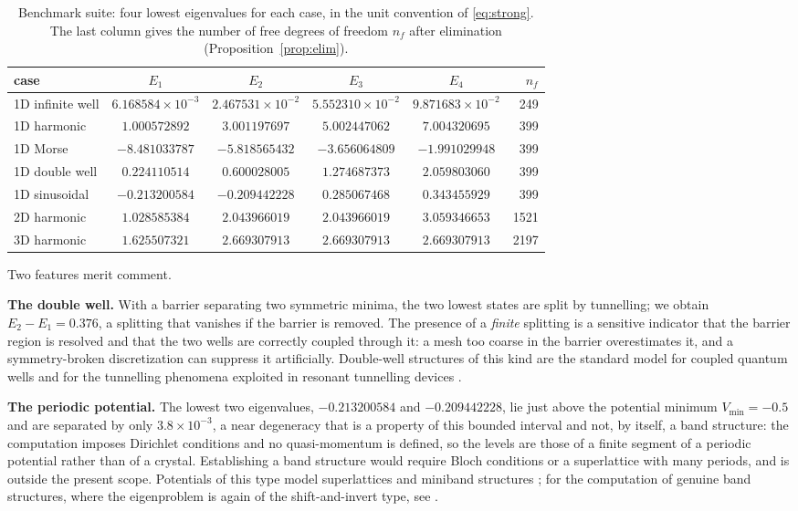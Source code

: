 \documentclass[pdflatex,sn-mathphys-num]{sn-jnl}
\theoremstyle{thmstyleone}%
\theoremstyle{thmstyletwo}%
\theoremstyle{thmstylethree}%
\begin{document}
\begin{table}[t]
\caption{Benchmark suite: four lowest eigenvalues for each case, in the unit
convention of \eqref{eq:strong}. The last column gives the number of free
degrees of freedom $n_f$ after elimination
(Proposition~\ref{prop:elim}).}\label{tab:cases}
\begin{tabular}{@{}lccccr@{}}
\toprule
case & $E_1$ & $E_2$ & $E_3$ & $E_4$ & $n_f$ \\
\midrule
1D infinite well    & $6.168584\times10^{-3}$ & $2.467531\times10^{-2}$ & $5.552310\times10^{-2}$ & $9.871683\times10^{-2}$ & 249 \\
1D harmonic         & $1.000572892$ & $3.001197697$ & $5.002447062$ & $7.004320695$ & 399 \\
1D Morse            & $-8.481033787$ & $-5.818565432$ & $-3.656064809$ & $-1.991029948$ & 399 \\
1D double well      & $0.224110514$ & $0.600028005$ & $1.274687373$ & $2.059803060$ & 399 \\
1D sinusoidal       & $-0.213200584$ & $-0.209442228$ & $0.285067468$ & $0.343455929$ & 399 \\
2D harmonic         & $1.028585384$ & $2.043966019$ & $2.043966019$ & $3.059346653$ & 1521 \\
3D harmonic         & $1.625507321$ & $2.669307913$ & $2.669307913$ & $2.669307913$ & 2197 \\
\bottomrule
\end{tabular}
\end{table}

Two features merit comment.

\textbf{The double well.} With a barrier separating two symmetric minima, the
two lowest states are split by tunnelling; we obtain $E_2 - E_1 = 0.376$, a
splitting that vanishes if the barrier is removed. The presence of a
\emph{finite} splitting is a sensitive indicator that the barrier region is
resolved and that the two wells are correctly coupled through it: a mesh too
coarse in the barrier overestimates it, and a symmetry-broken discretization can
suppress it artificially. Double-well structures of this kind are the standard
model for coupled quantum wells and for the tunnelling phenomena exploited in
resonant tunnelling devices \cite{wang2009}.

\textbf{The periodic potential.} The lowest two eigenvalues,
$-0.213200584$ and $-0.209442228$, lie just above the potential minimum
$V_{\min} = -0.5$ and are separated by only $3.8\times10^{-3}$, a near
degeneracy that is a property of this bounded interval and not, by itself, a band
structure: the computation imposes Dirichlet conditions and no quasi-momentum is
defined, so the levels are those of a finite segment of a periodic potential
rather than of a crystal. Establishing a band structure would require Bloch
conditions or a superlattice with many periods, and is outside the present scope.
Potentials of this type model superlattices and miniband structures
\cite{harrison2005}; for the computation of genuine band structures, where the
eigenproblem is again of the shift-and-invert type, see \cite{bandstruct2020}.
\end{document}
